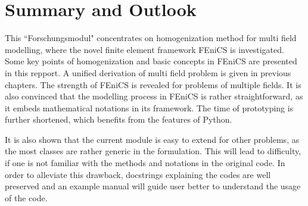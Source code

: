 %
%
%
%
%
%

\chapter{Summary and Outlook}
This ``Forschungsmodul" concentrates on homogenization method for multi field modelling, where the novel finite element framework FEniCS is investigated. Some key points of homogenization and basic concepts in FEniCS are presented in this repport. A unified derivation of multi field problem is given in previous chapters. The strength of FEniCS is revealed for problems of multiple fields. It is also convinced that the modelling process in FEniCS is rather straightforward, as it embeds mathematical notations in its framework. The time of prototyping is further shortened, which benefits from the features of Python.

It is also shown that the current module is easy to extend for other problems, as the most classes are rather generic in the formulation. This will lead to difficulty, if one is not familiar with the methods and notations in the original code. In order to alleviate this drawback, docstrings explaining the codes are well preserved and an example manual will guide user better to understand the usage of the code.

